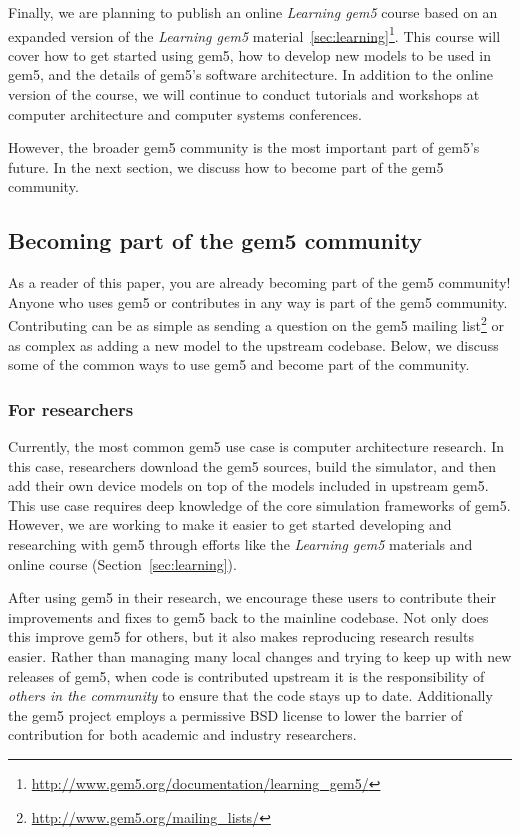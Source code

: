 Finally, we are planning to publish an online \emph{Learning gem5} course based on an expanded version of the \emph{Learning gem5} material~\ref{sec:learning}\footnote{\url{http://www.gem5.org/documentation/learning_gem5/}}.
This course will cover how to get started using gem5, how to develop new models to be used in gem5, and the details of gem5's software architecture.
In addition to the online version of the course, we will continue to conduct tutorials and workshops at computer architecture and computer systems conferences.

However, the broader gem5 community is the most important part of gem5's future.
In the next section, we discuss how to become part of the gem5 community.

\subsection{Becoming part of the gem5 community}

As a reader of this paper, you are already becoming part of the gem5 community!
Anyone who uses gem5 or contributes in any way is part of the gem5 community.
Contributing can be as simple as sending a question on the gem5 mailing list\footnote{\url{http://www.gem5.org/mailing_lists/}} or as complex as adding a new model to the upstream codebase.
Below, we discuss some of the common ways to use gem5 and become part of the community.

\subsubsection{For researchers}

Currently, the most common gem5 use case is computer architecture research.
In this case, researchers download the gem5 sources, build the simulator, and then add their own device models on top of the models included in upstream gem5.
This use case requires deep knowledge of the core simulation frameworks of gem5.
However, we are working to make it easier to get started developing and researching with gem5 through efforts like the \emph{Learning gem5} materials and online course (Section~\ref{sec:learning}).

After using gem5 in their research, we encourage these users to contribute their improvements and fixes to gem5 back to the mainline codebase.
Not only does this improve gem5 for others, but it also makes reproducing research results easier.
Rather than managing many local changes and trying to keep up with new releases of gem5, when code is contributed upstream it is the responsibility of \emph{others in the community} to ensure that the code stays up to date.
Additionally the gem5 project employs a permissive BSD license to lower the barrier of contribution for both academic and industry researchers.


